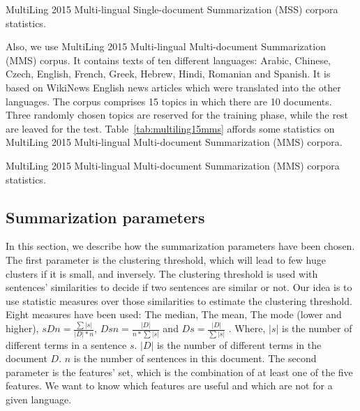 \begin{table*}[!ht]
	\centering
	\caption{MultiLing 2015 Multi-lingual Single-document Summarization (MSS) corpora statistics.}
	\label{tab:multiling15mss}
\end{table*}

Also, we use MultiLing 2015 Multi-lingual Multi-document Summarization (MMS) corpus. 
It contains texts of ten different languages: Arabic, Chinese, Czech, English, French, Greek, Hebrew,
Hindi, Romanian and Spanish.
It is based on WikiNews English news articles which were translated into the other languages.
The corpus comprises 15 topics in which there are 10 documents. 
Three randomly chosen topics are reserved for the training phase, while the rest are leaved for the test.
Table~\ref{tab:multiling15mms} affords some statistics on MultiLing 2015 Multi-lingual Multi-document Summarization (MMS) corpora.

\begin{table*}[!ht]
	\centering
	\caption{MultiLing 2015 Multi-lingual Multi-document Summarization (MMS) corpora statistics.}
	\label{tab:multiling15mms}
\end{table*}


\subsection{Summarization parameters}

In this section, we describe how the summarization parameters have been chosen.
The first parameter is the clustering threshold, which will lead to few huge clusters if it is small, and inversely.
The clustering threshold is used with sentences' similarities to decide if two sentences are similar or not.
Our idea is to use statistic measures over those similarities to estimate the clustering threshold.
Eight measures have been used: The median, The mean, The mode (lower and higher), $ sDn = \frac{\sum |s|}{|D| * n}$, $ Dsn = \frac{|D|}{n * \sum |s|}$ and $ Ds = \frac{|D|}{\sum |s|}$ .
Where, $|s|$ is the number of different terms in a sentence $s$. 
$|D|$ is the number of different terms in the document $D$.
$n$ is the number of sentences in this document.
%
The second parameter is the features' set, which is the combination of at least one of the five features. 
We want to know which features are useful and which are not for a given language.

